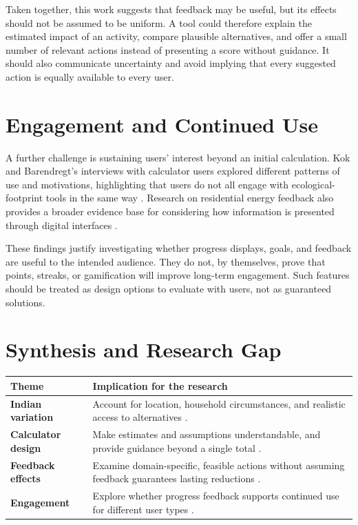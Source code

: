 \documentclass[10pt,a4paper,twocolumn]{article}
\begin{document}
Taken together, this work suggests that feedback may be useful, but its effects should not be assumed to be uniform. A tool could therefore explain the estimated impact of an activity, compare plausible alternatives, and offer a small number of relevant actions instead of presenting a score without guidance. It should also communicate uncertainty and avoid implying that every suggested action is equally available to every user.

\section{Engagement and Continued Use}
A further challenge is sustaining users' interest beyond an initial calculation. Kok and Barendregt's interviews with calculator users explored different patterns of use and motivations, highlighting that users do not all engage with ecological-footprint tools in the same way \cite{kok2021}. Research on residential energy feedback also provides a broader evidence base for considering how information is presented through digital interfaces \cite{chatzigeorgiou2021}.

These findings justify investigating whether progress displays, goals, and feedback are useful to the intended audience. They do not, by themselves, prove that points, streaks, or gamification will improve long-term engagement. Such features should be treated as design options to evaluate with users, not as guaranteed solutions.

\section{Synthesis and Research Gap}
\begin{table}[t]
\centering
\small
\begin{tabularx}{\columnwidth}{>{\bfseries}p{1.65cm} X}
\toprule
\textbf{Theme} & \textbf{Implication for the research} \\
\midrule
Indian variation & Account for location, household circumstances, and realistic access to alternatives \cite{lee2021,khandelwal2019}.\\
Calculator design & Make estimates and assumptions understandable, and provide guidance beyond a single total \cite{mulrow2019,collins2020}.\\
Feedback effects & Examine domain-specific, feasible actions without assuming feedback guarantees lasting reductions \cite{hoffmann2024,lasarov2024}.\\
Engagement & Explore whether progress feedback supports continued use for different user types \cite{kok2021,chatzigeorgiou2021}.\\
\bottomrule
\end{tabularx}
\end{table}
\end{document}
